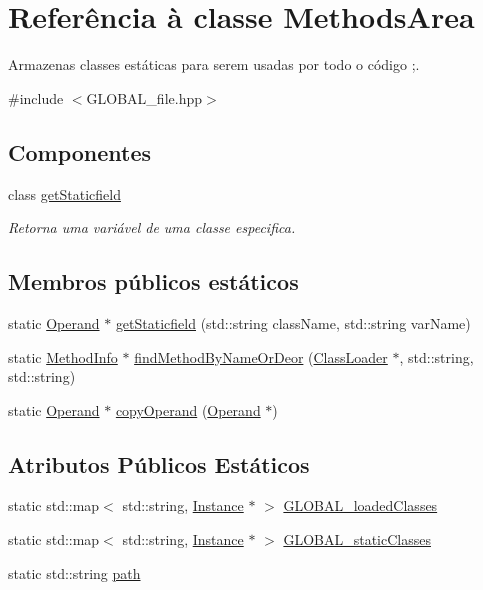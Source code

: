\hypertarget{class_methods_area}{}\section{Referência à classe Methods\+Area}
\label{class_methods_area}


Armazenas classes estáticas para serem usadas por todo o código ;.  




{\ttfamily \#include $<$G\+L\+O\+B\+A\+L\+\_\+file.\+hpp$>$}

\subsection*{Componentes}
\begin{DoxyCompactItemize}
\item 
class \hyperlink{class_methods_area_1_1get_staticfield}{get\+Staticfield}
\begin{DoxyCompactList}\small\item\em Retorna uma variável de uma classe especifica. \end{DoxyCompactList}\end{DoxyCompactItemize}
\subsection*{Membros públicos estáticos}
\begin{DoxyCompactItemize}
\item 
static \hyperlink{struct_operand}{Operand} $\ast$ \hyperlink{class_methods_area_adf2c71d678e710c5fd1c357737b07f5b}{get\+Staticfield} (std\+::string class\+Name, std\+::string var\+Name)
\item 
static \hyperlink{struct_method_info}{Method\+Info} $\ast$ \hyperlink{class_methods_area_ab8111f3fc9b55f1f8dbbbe0c1ca76d89}{find\+Method\+By\+Name\+Or\+Deor} (\hyperlink{class_class_loader}{Class\+Loader} $\ast$, std\+::string, std\+::string)
\item 
static \hyperlink{struct_operand}{Operand} $\ast$ \hyperlink{class_methods_area_ab4f4988ce71a130209877d841554b718}{copy\+Operand} (\hyperlink{struct_operand}{Operand} $\ast$)
\end{DoxyCompactItemize}
\subsection*{Atributos Públicos Estáticos}
\begin{DoxyCompactItemize}
\item 
static std\+::map$<$ std\+::string, \hyperlink{struct_instance}{Instance} $\ast$ $>$ \hyperlink{class_methods_area_a210b48b3c45d8a2d981af099b6490438}{G\+L\+O\+B\+A\+L\+\_\+loaded\+Classes}
\item 
static std\+::map$<$ std\+::string, \hyperlink{struct_instance}{Instance} $\ast$ $>$ \hyperlink{class_methods_area_a34d779cc67f370a08cedc65245af2e7e}{G\+L\+O\+B\+A\+L\+\_\+static\+Classes}
\item 
static std\+::string \hyperlink{class_methods_area_af7210f4ca8ad442f7f9b83baa750b015}{path}
\end{DoxyCompactItemize}


